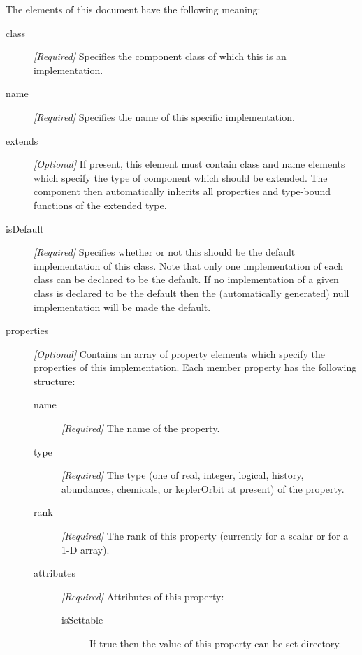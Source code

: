 The elements of this document have the following meaning:
\begin{description}
\item [{\normalfont \ttfamily class}] \emph{[Required]} Specifies the component class of which this is an implementation.
\item [{\normalfont \ttfamily name}] \emph{[Required]} Specifies the name of this specific implementation.
\item [{\normalfont \ttfamily extends}] \emph{[Optional]} If present, this element must contain {\normalfont \ttfamily class} and {\normalfont \ttfamily name} elements which specify the type of component which should be extended. The component then automatically inherits all properties and type-bound functions of the extended type.
\item [{\normalfont \ttfamily isDefault}] \emph{[Required]} Specifies whether or not this should be the default implementation of this class. Note that only one implementation of each class can be declared to be the default. If no implementation of a given class is declared to be the default then the (automatically generated) {\normalfont \ttfamily null} implementation will be made the default.
\item [{\normalfont \ttfamily properties}] \emph{[Optional]} Contains an array of {\normalfont \ttfamily property} elements which specify the properties of this implementation. Each member {\normalfont \ttfamily property} has the following structure:
\begin{description}
\item [{\normalfont \ttfamily name}] \emph{[Required]} The name of the property. 
\item [{\normalfont \ttfamily type}] \emph{[Required]} The type (one of {\normalfont \ttfamily real}, {\normalfont \ttfamily integer}, {\normalfont \ttfamily logical}, {\normalfont \ttfamily history}, {\normalfont \ttfamily abundances}, {\normalfont \ttfamily chemicals}, or {\normalfont \ttfamily keplerOrbit} at present) of the property.
\item [{\normalfont \ttfamily rank}] \emph{[Required]} The rank of this property (currently {\normalfont {}} for a scalar or {\normalfont {}} for a 1-D array).
\item [{\normalfont \ttfamily attributes}] \emph{[Required]} Attributes of this property:
\begin{description}
\item [{\normalfont \ttfamily isSettable}] If {\normalfont \ttfamily true} then the value of this property can be set directory.

\end{description}
\end{description}
\end{description}
